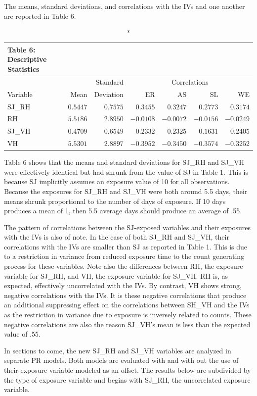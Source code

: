 \documentclass[ShortAfour,times,sageapa]{sagej}
\begin{document}
	The means, standard deviations, and correlations with the IVs and one another are reported in Table 6.
	
	\begin{longtable}{lrrrrrr}
		\caption*{
			{\large Table 6: Descriptive Statistics}
		} \\ 
		\toprule
		&  &  Standard & \multicolumn{4}{c}{Correlations} \\ 
		\cmidrule(lr){4-7}
		Variable & Mean & Deviation & ER & AS & SL & WE \\ 
		\midrule
		SJ\_RH & $0.5447$ & $0.7575$ & $0.3455$ & $0.3247$ & $0.2773$ & $0.3174$ \\ 
		RH & $5.5186$ & $2.8950$ & $-0.0108$ & $-0.0072$ & $-0.0156$ & $-0.0249$ \\ 
		SJ\_VH & $0.4709$ & $0.6549$ & $0.2332$ & $0.2325$ & $0.1631$ & $0.2405$ \\ 
		VH & $5.5301$ & $2.8897$ & $-0.3952$ & $-0.3450$ & $-0.3574$ & $-0.3252$ \\ 
		\bottomrule
	\end{longtable}
	
	Table 6 shows that the means and standard deviations for SJ\_RH and SJ\_VH were effectively identical but had shrunk from the value of SJ in Table 1.
	This is because SJ implicitly assumes an exposure value of 10 for all observations. 
	Because the exposures for SJ\_RH and SJ\_VH were both around 5.5 days, their means shrunk proportional to the number of days of exposure.
	If 10 days produces a mean of 1, then 5.5 average days should produce an average of .55.
	
	The pattern of correlations between the SJ-exposed variables and their exposures with the IVs is also of note. 
	In the case of both SJ\_RH and SJ\_VH, their correlations with the IVs are smaller than SJ as reported in Table 1. 
	This is due to a restriction in variance from reduced exposure time to the count generating process for these variables.
	Note also the differences between RH, the exposure variable for SJ\_RH, and VH, the exposure variable for SJ\_VH.
	RH is, as expected, effectively uncorrelated with the IVs.
	By contrast, VH shows strong, negative correlations with the IVs.
	It is these negative correlations that produce an additional suppressing effect on the correlations between SH\_VH and the IVs as the restriction in variance due to exposure is inversely related to counts.
	These negative correlations are also the reason SJ\_VH's mean is less than  the expected value of .55.
	
	In sections to come, the new SJ\_RH and SJ\_VH variables are analyzed in separate PR models.
	Both models are evaluated with and with out the use of their exposure variable modeled as an offset.
	The results below are subdivided by the type of exposure variable and begins with SJ\_RH, the uncorrelated exposure variable.
	
\end{document}
